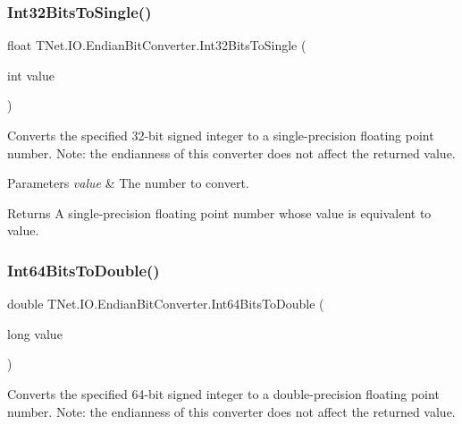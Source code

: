 \subsubsection{\texorpdfstring{Int32\+Bits\+To\+Single()}{Int32BitsToSingle()}}
{\footnotesize\ttfamily float T\+Net.\+I\+O.\+Endian\+Bit\+Converter.\+Int32\+Bits\+To\+Single (\begin{DoxyParamCaption}\item[{int}]{value }\end{DoxyParamCaption})}



Converts the specified 32-\/bit signed integer to a single-\/precision floating point number. Note\+: the endianness of this converter does not affect the returned value. 


\begin{DoxyParams}{Parameters}
{\em value} & The number to convert. \\
\hline
\end{DoxyParams}
\begin{DoxyReturn}{Returns}
A single-\/precision floating point number whose value is equivalent to value.
\end{DoxyReturn}
\mbox{\label{class_t_net_1_1_i_o_1_1_endian_bit_converter_a33615ec4ba0c20f450b34599d76fcc7f}} 
\subsubsection{\texorpdfstring{Int64\+Bits\+To\+Double()}{Int64BitsToDouble()}}
{\footnotesize\ttfamily double T\+Net.\+I\+O.\+Endian\+Bit\+Converter.\+Int64\+Bits\+To\+Double (\begin{DoxyParamCaption}\item[{long}]{value }\end{DoxyParamCaption})}



Converts the specified 64-\/bit signed integer to a double-\/precision floating point number. Note\+: the endianness of this converter does not affect the returned value. 


